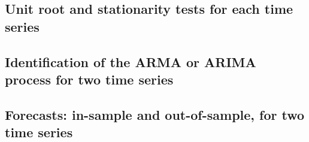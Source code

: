 \documentclass[12pt]{article}
\begin{document}
\subsection{Unit root and stationarity tests for each time series}

\subsection{Identification of the ARMA or ARIMA process for two time series}

\subsection{Forecasts: in-sample and out-of-sample, for two time series}
\end{document}
